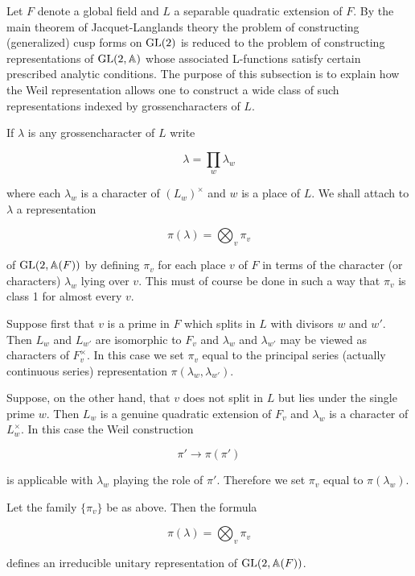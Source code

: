 Let $F$ denote a global field and $L$ a separable quadratic extension of $F$. By the main theorem of Jacquet-Langlands theory the problem of constructing (generalized) cusp forms on $\operatorname{GL}(2)$ is reduced to the problem of constructing representations of $\operatorname{GL}(2,\mathbb{A})$ whose associated L-functions satisfy certain prescribed analytic conditions. The purpose of this subsection is to explain how the Weil representation allows one to construct a wide class of such representations indexed by grossencharacters of $L$.

If $\lambda$ is any grossencharacter of $L$ write

\begin{equation}\label{eq:7.22}
\lambda = \prod_w \lambda_w\tag{7.22}
\end{equation}

where each $\lambda_w$ is a character of $(L_w)^{\times}$ and $w$ is a place of $L$. We shall attach to $\lambda$ a representation

\[
\pi(\lambda) = \bigotimes_v \pi_v
\]

of $\operatorname{GL}(2,\mathbb{A}(F))$ by defining $\pi_v$ for each place $v$ of $F$ in terms of the character (or characters) $\lambda_w$ lying over $v$. This must of course be done in such a way that $\pi_v$ is class 1 for almost every $v$.

Suppose first that $v$ is a prime in $F$ which splits in $L$ with divisors $w$ and $w'$. Then $L_w$ and $L_{w'}$ are isomorphic to $F_v$ and $\lambda_w$ and $\lambda_{w'}$ may be viewed as characters of $F_v^{\times}$. In this case we set $\pi_v$ equal to the principal series (actually continuous series) representation $\pi(\lambda_w, \lambda_{w'})$.

Suppose, on the other hand, that $v$ does not split in $L$ but lies under the single prime $w$. Then $L_w$ is a genuine quadratic extension of $F_v$ and $\lambda_w$ is a character of $L_w^{\times}$. In this case the Weil construction

\[
\pi' \to \pi(\pi')
\]

is applicable with $\lambda_w$ playing the role of $\pi'$. Therefore we set $\pi_v$ equal to $\pi(\lambda_w)$.

\begin{proposition}\label{prop:7.8}

Let the family $\{\pi_v\}$ be as above. Then the formula

\begin{equation}\label{eq:7.23}
\pi(\lambda) = \bigotimes_v \pi_v\tag{7.23}
\end{equation}

defines an irreducible unitary representation of $\operatorname{GL}(2,\mathbb{A}(F))$.

\end{proposition}

